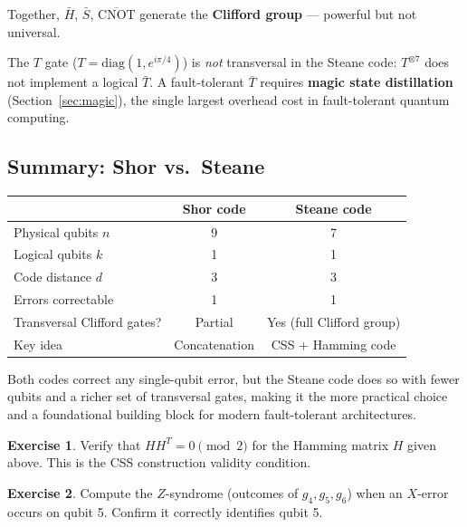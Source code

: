 \documentclass[11pt, a4paper]{article}
\theoremstyle{definition}
\newtheorem{exercise}{Exercise}[section]
\theoremstyle{plain}
\theoremstyle{remark}
\begin{document}
\medskip\noindent
Together, $\bar{H}$, $\bar{S}$, $\overline{\mathrm{CNOT}}$ generate
the \textbf{Clifford group} --- powerful but not universal.

\begin{caution}
The $T$ gate ($T = \mathrm{diag}(1, e^{i\pi/4})$) is \emph{not}
transversal in the Steane code: $T^{\otimes 7}$ does not implement
a logical $\bar{T}$.  A fault-tolerant $\bar{T}$ requires
\textbf{magic state distillation} (Section~\ref{sec:magic}), the
single largest overhead cost in fault-tolerant quantum computing.
\end{caution}

\subsection{Summary: Shor vs.\ Steane}

\begin{center}
\renewcommand{\arraystretch}{1.3}
\begin{tabular}{@{} l c c @{}}
  \toprule
  & \textbf{Shor code} & \textbf{Steane code}\\
  \midrule
  Physical qubits $n$         & 9 & 7\\
  Logical qubits $k$          & 1 & 1\\
  Code distance $d$           & 3 & 3\\
  Errors correctable          & 1 & 1\\
  Transversal Clifford gates? & Partial & Yes (full Clifford group)\\
  Key idea & Concatenation & CSS + Hamming code\\
  \bottomrule
\end{tabular}
\end{center}

\noindent
Both codes correct any single-qubit error, but the Steane code does
so with fewer qubits and a richer set of transversal gates, making it
the more practical choice and a foundational building block for modern
fault-tolerant architectures.


\begin{exercise}
Verify that $H H^T = 0 \pmod{2}$ for the Hamming matrix $H$ given above.
This is the CSS construction validity condition.
\end{exercise}

\begin{exercise}
Compute the $Z$-syndrome (outcomes of $g_4, g_5, g_6$) when an $X$-error
occurs on qubit 5.  Confirm it correctly identifies qubit 5.
\end{exercise}
\end{document}
